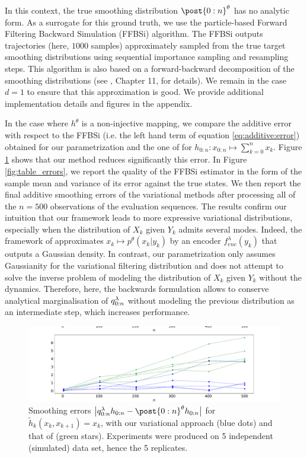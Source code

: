 \documentclass{article}
\begin{document}
In this context, the true smoothing distribution $\post{0:n}^\parvec$ has no analytic form. As a surrogate for this ground truth, we use the particle-based Forward Filtering Backward Simulation (FFBSi) algorithm. The FFBSi outputs  trajectories (here, $1000$ samples) approximately sampled from the true target smoothing distributions using sequential importance sampling and resampling steps. This algorithm is also based on a forward-backward decomposition of the smoothing distributions (see \cite{douc2014nonlinear}, Chapter 11, for details). 
We remain in the case $d = 1$ to ensure that this approximation is good. We provide additional implementation details and figures in the appendix.

In the case where $h^\theta$ is a non-injective mapping, we compare the additive error with respect to the FFBSi (i.e. the left hand term of equation \eqref{eq:additive:error}) obtained for our parametrization and the one of \cite{Hlv2021DisentanglingIF} for $h_{0:n}: x_{0:n} \mapsto \sum_{k=0}^n x_k$. 
Figure \ref{fig:additive_error_nonlinear} shows that our method reduces significantly this error. In Figure \ref{fig:table_errors}, we report the quality of the FFBSi estimator in the form of the sample mean and variance of its error against the true states. We then report the final additive smoothing errors of the variational methods after processing all of the $n=500$ observations of the evaluation sequences. The results confirm our intuition that our framework leads to more expressive variational distributions, especially when the distribution of $X_k$ given $Y_k$ admits several modes. Indeed, the framework of \cite{Hlv2021DisentanglingIF} approximates $x_k \mapsto p^\theta(x_k|y_k)$ by an encoder   $f_{enc}^\lambda(y_k)$ that outputs a Gaussian density. 
In contrast, our parametrization only assumes Gaussianity for the variational filtering distribution and does not attempt to solve the inverse problem of modeling the distribution of $X_k$ given $Y_k$ without the dynamics. 
Therefore, here, the backwards formulation allows to conserve analytical marginalisation of $q_{0:n}^{\lambda}$ without modeling the previous distribution as an intermediate step, which increases performance.


\begin{figure}
      \includegraphics[width=\linewidth, trim={0 0 0 1cm}, clip]{./additive_nonlinear_4.pdf}
      \caption{Smoothing errors $\big| \vd{0:n} h_{0:n} -  \post{0:n}^{\parvec} h_{0:n} \big|$ for $\tilde{h}_{k}(x_k, x_{k+1}) = x_k$, with our variational approach (blue dots) and that of \cite{Hlv2021DisentanglingIF} (green stars). Experiments were produced on 5 independent (simulated) data set, hence the 5 replicates.}
      \label{fig:additive_error_nonlinear}
\end{figure}
\end{document}

